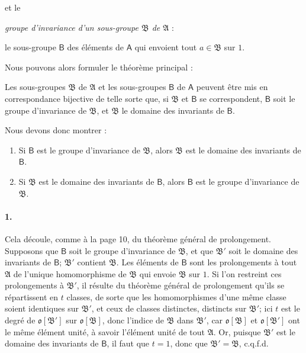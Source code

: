 et le

\emph{groupe d'invariance d'un sous-groupe \(\mathfrak B\) de \(\mathfrak A\)} :

le sous-groupe \(\mathsf B\) des éléments de \(\mathsf A\) qui envoient tout \(a\in\mathfrak B\) sur \(1\).

Nous pouvons alors formuler le théorème principal :

Les sous-groupes \(\mathfrak B\) de \(\mathfrak A\) et les sous-groupes \(\mathsf B\) de \(\mathsf A\) peuvent être mis en correspondance bijective de telle sorte que, si \(\mathfrak B\) et \(\mathsf B\) se correspondent, \(\mathsf B\) soit le groupe d'invariance de \(\mathfrak B\), et \(\mathfrak B\) le domaine des invariants de \(\mathsf B\).

Nous devons donc montrer :

\begin{enumerate}
\item Si \(\mathsf B\) est le groupe d'invariance de \(\mathfrak B\), alors \(\mathfrak B\) est le domaine des invariants de \(\mathsf B\).
\item Si \(\mathfrak B\) est le domaine des invariants de \(\mathsf B\), alors \(\mathsf B\) est le groupe d'invariance de \(\mathfrak B\).
\end{enumerate}

\paragraph{1.}
Cela découle, comme à la page 10, du théorème général de prolongement. Supposons que \(\mathsf B\) soit le groupe d'invariance de \(\mathfrak B\), et que \(\mathfrak B'\) soit le domaine des invariants de \(\mathsf B\); \(\mathfrak B'\) contient \(\mathfrak B\). Les éléments de \(\mathsf B\) sont les prolongements à tout \(\mathfrak A\) de l'unique homomorphisme de \(\mathfrak B\) qui envoie \(\mathfrak B\) sur \(1\). Si l'on restreint ces prolongements à \(\mathfrak B'\), il résulte du théorème général de prolongement qu'ils se répartissent en \(t\) classes, de sorte que les homomorphismes d'une même classe soient identiques sur \(\mathfrak B'\), et ceux de classes distinctes, distincts sur \(\mathfrak B'\); ici \(t\) est le degré de \(\mathfrak o[\mathfrak B']\) sur \(\mathfrak o[\mathfrak B]\), donc l'indice de \(\mathfrak B\) dans \(\mathfrak B'\), car \(\mathfrak o[\mathfrak B]\) et \(\mathfrak o[\mathfrak B']\) ont le même élément unité, à savoir l'élément unité de tout \(\mathfrak A\). Or, puisque \(\mathfrak B'\) est le domaine des invariants de \(\mathsf B\), il faut que \(t=1\), donc que \(\mathfrak B'=\mathfrak B\), c.q.f.d.

